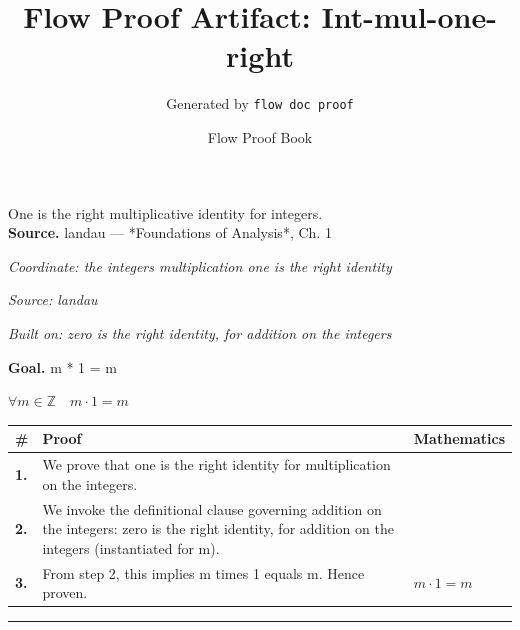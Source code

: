 \documentclass[11pt]{article}
\title{Flow Proof Artifact: Int-mul-one-right}
\author{Generated by \texttt{flow doc proof}}
\date{Flow Proof Book}
\theoremstyle{definition}
\begin{document}
\maketitle
One is the right multiplicative identity for integers.\\[0.5em]
\textbf{Source.} landau — *Foundations of Analysis*, Ch. 1\\[0.5em]
\bigskip
{}\par
\smallskip\noindent\textit{Coordinate: the integers \cdot multiplication \cdot one is the right identity}\par
\smallskip\noindent\textit{Source: landau}\par
\smallskip\noindent\textit{Built on: zero is the right identity, for addition on the integers}\par
\medskip
\noindent\textbf{Goal.} m * 1 = m\par
\noindent$\displaystyle \forall m \in \mathbb{Z}\quad m \cdot 1 = m$\par
\medskip
\noindent
\begin{tabular}{@{} >{\raggedright\arraybackslash}p{} >{\raggedright\arraybackslash}p{} >{\raggedleft\arraybackslash}p{} @{}}
\textbf{\#} & \textbf{Proof} & \textbf{Mathematics} \\
\midrule
\textbf{1.} & We prove that one is the right identity for multiplication on the integers. & \\[0.45em]
\textbf{2.} & We invoke the definitional clause governing addition on the integers: zero is the right identity, for addition on the integers (instantiated for m). & \\[0.45em]
\textbf{3.} & From step 2, this implies m times 1 equals m. Hence proven. & $\displaystyle m \cdot 1 = m$ \\[0.45em]
\bottomrule
\end{tabular}
\label{thm:Int-multiplication-one_is_the_right_identity}
\par\medskip\hrule
\end{document}
